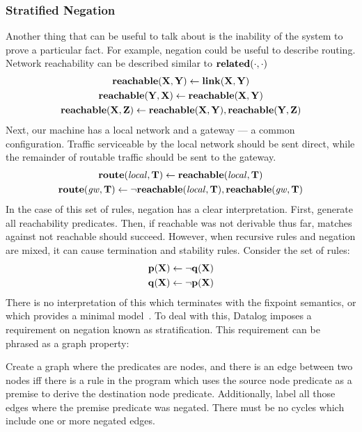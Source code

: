 \subsubsection{Stratified Negation}
Another thing that can be useful to talk about is the inability of the system to prove a particular fact.
For example, negation could be useful to describe routing.
Network reachability can be described similar to ${\bf related}(\cdot, \cdot)$
\begin{gather*}
        {\bf reachable}({\bf X}, {\bf Y}) \leftarrow {\bf link}({\bf X}, {\bf Y})\\
        {\bf reachable}({\bf Y}, {\bf X}) \leftarrow {\bf reachable}({\bf X}, {\bf Y})\\
        {\bf reachable}({\bf X}, {\bf Z}) \leftarrow {\bf reachable}({\bf X}, {\bf Y}), {\bf reachable}({\bf Y}, {\bf Z})
\end{gather*}
Next, our machine has a local network and a gateway --- a common configuration.
Traffic serviceable by the local network should be sent direct, while the remainder of routable traffic should be sent to the gateway.
\begin{gather*}
        {\bf route}({\it local}, {\bf T}) \leftarrow {\bf reachable}({\it local}, {\bf T})\\
        {\bf route}({\it gw}, {\bf T}) \leftarrow \neg {\bf reachable}({\it local}, {\bf T}), {\bf reachable}({\it gw}, {\bf T})
\end{gather*}
In the case of this set of rules, negation has a clear interpretation.
First, generate all reachability predicates.
Then, if reachable was not derivable thus far, matches against not reachable should succeed.
However, when recursive rules and negation are mixed, it can cause termination and stability rules. Consider the set of rules:
\begin{gather*}
        {\bf p}({\bf X}) \leftarrow \neg {\bf q}({\bf X})\\
        {\bf q}({\bf X}) \leftarrow \neg {\bf p}({\bf X})
\end{gather*}
There is no interpretation of this which terminates with the fixpoint semantics, or which provides a minimal model~\cite{prologbook}.
To deal with this, Datalog imposes a requirement on negation known as stratification.
This requirement can be phrased as a graph property:

Create a graph where the predicates are nodes, and there is an edge between two nodes iff there is a rule in the program which uses the source node predicate as a premise to derive the destination node predicate.
Additionally, label all those edges where the premise predicate was negated.
There must be no cycles which include one or more negated edges.

